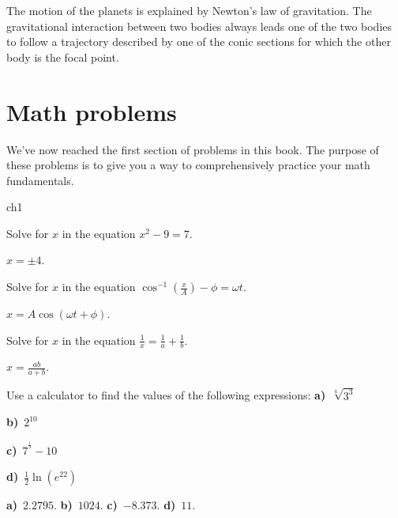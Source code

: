 		The motion of the planets is explained by Newton's law of gravitation.
		The gravitational interaction between two bodies always leads one of the two bodies to follow a trajectory described by one of the conic sections
		for which the other body is the focal point.


\section{Math problems}
\label{sec:math_problems}
	
	We've now reached the first section of problems in this book.
	The purpose of these problems is to give you a way to comprehensively practice your math fundamentals.

	
{\small 
	 
\begin{problems}{ch1}

	\vspace*{3mm}


	
	\begin{problem}
		Solve for $x$ in the equation $x^2-9=7$.
		\begin{answer}$x=\pm 4$.\end{answer}
	\end{problem}

	\begin{problem}
		Solve for $x$ in the equation $\cos^{-1}\!\left( \frac{x}{A} \right) - \phi = \omega t$.
		\begin{answer}$x=A\cos(\omega t+\phi)$.\end{answer}
	\end{problem}

	\begin{problem}		\label{mathprob:ch1:fractions2}
		Solve for $x$ in the equation $\frac{1}{x}=\frac{1}{a}+\frac{1}{b}$.	
		\begin{answer}$x=\frac{ab}{a+b}$.\end{answer}
	\end{problem}

	\begin{problem}
		Use a calculator to find the values of the following expressions:
		\fourcol
			\textbf{a)}~$\sqrt[4]{3^3}$
			
			\textbf{b)}~$2^{10}$
			
			\textbf{c)}~$7^{^{\frac{1}{4}}}-10$
			
			\textbf{d)}~$\frac{1}{2}\ln(e^{22})$
		\endfourcol
		\begin{answer}\textbf{a)}~$2.2795$.
					\textbf{b)}~$1024$.
					\textbf{c)}~$-8.373$.
					\textbf{d)}~$11$.\end{answer}
	\end{problem}



\end{problems}}
